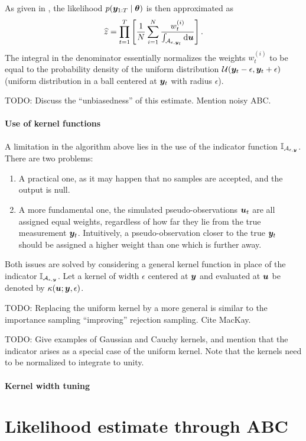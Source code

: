 As given in \cite{jasra-time-series}, the likelihood $p(\bm{y}_{1:T} \mid \bm{\theta})$ is then approximated as
\begin{equation*}
\widehat{z} = \prod_{t=1}^T \left[\frac{1}{N} \sum_{i=1}^N \frac{w_t^{(i)}}{\int_{\mathcal{A}_{\epsilon, \bm{y}_t}} \mathrm{d}{\bm{u}}} \right].
\end{equation*}
The integral in the denominator essentially normalizes the weights $w_t^{(i)}$ to be equal to the probability density of the uniform distribution $\mathcal{U}(\bm{y}_t - \epsilon, \bm{y}_t + \epsilon)$ (uniform distribution in a ball centered at $\bm{y}_t$ with radius $\epsilon$).

{\color{red} TODO: Discuss the ``unbiasedness'' of this estimate. Mention noisy ABC.}


\paragraph{Use of kernel functions}
A limitation in the algorithm above lies in the use of the indicator function $\mathbb{I}_{\mathcal{A}_{\epsilon, \bm{y}}}$. There are two problems:
\begin{enumerate}
    \item A practical one, as it may happen that no samples are accepted, and the output is null.
    \item A more fundamental one, the simulated pseudo-observations $\bm{u}_t$ are all assigned equal weights, regardless of how far they lie from the true measurement $\bm{y}_t$. Intuitively, a pseudo-observation closer to the true $\bm{y}_t$ should be assigned a higher weight than one which is further away.
\end{enumerate}
Both issues are solved by considering a general kernel function in place of the indicator $\mathbb{I}_{\mathcal{A}_{\epsilon, \bm{y}}}$. Let a kernel of width $\epsilon$ centered at $\bm{y}$ and evaluated at $\bm{u}$ be denoted by $\kappa(\bm{u}; \bm{y}, \epsilon)$.


{\color{red} TODO: Replacing the uniform kernel by a more general is similar to the importance sampling ``improving'' rejection sampling. Cite MacKay.}

{\color{red} TODO: Give examples of Gaussian and Cauchy kernels, and mention that the indicator arises as a special case of the uniform kernel. Note that the kernels need to be normalized to integrate to unity.}

\paragraph{Kernel width tuning}


\section{Likelihood estimate through ABC} \label{sec:abcmh}